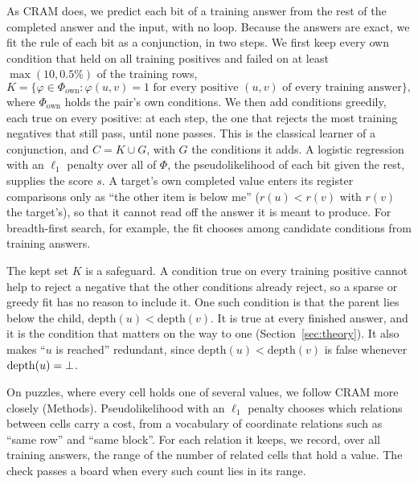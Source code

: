 As CRAM does, we predict each bit of a training answer from the rest of the completed answer and the input, with no
loop. Because the answers are exact, we fit the rule of each bit as a conjunction, in two steps. We first keep every own
condition that held on all training positives and failed on at least $\max(10, 0.5\%)$ of the training rows,
\begin{equation}
K = \{\varphi \in \Phi_{\mathrm{own}} : \varphi(u,v) = 1 \text{ for every positive } (u,v) \text{ of every training answer}\},
\label{eq:kept}
\end{equation}
where $\Phi_{\mathrm{own}}$ holds the pair's own conditions. We then add conditions greedily, each true on every positive:
at each step, the one that rejects the most training negatives that still pass, until none passes. This is the classical
learner of a conjunction\cite{haussler1988quantifying}, and $C = K \cup G$, with $G$ the conditions it adds. A logistic
regression with an $\ell_1$ penalty over all of $\Phi$, the pseudolikelihood of each bit given the rest, supplies the
score $s$. A target's own completed value enters its register comparisons only as ``the other item is below me'' ($r(u) < r(v)$
with $r(v)$ the target's), so that it cannot read off the answer it is meant to produce. For breadth-first search, for example, the fit
chooses among  candidate conditions from  training answers.

The kept set $K$ is a safeguard. A condition true on every training positive cannot help to reject a negative that the
other conditions already reject, so a sparse or greedy fit has no reason to include it. One such condition is that the
parent lies below the child, $\mathrm{depth}(u) < \mathrm{depth}(v)$. It is true at every finished answer, and it is
the condition that matters on the way to one (Section~\ref{sec:theory}). It also makes ``$u$ is reached'' redundant,
since $\mathrm{depth}(u) < \mathrm{depth}(v)$ is false whenever $\mathrm{depth}(u) = \bot$.

On puzzles, where every cell holds one of several values, we follow CRAM more closely (Methods). Pseudolikelihood with
an $\ell_1$ penalty chooses which relations between cells carry a cost, from a vocabulary of coordinate relations such
as ``same row'' and ``same block''. For each relation it keeps, we record, over all training answers, the range of the
number of related cells that hold a value. The check passes a board when every such count lies in its range.

